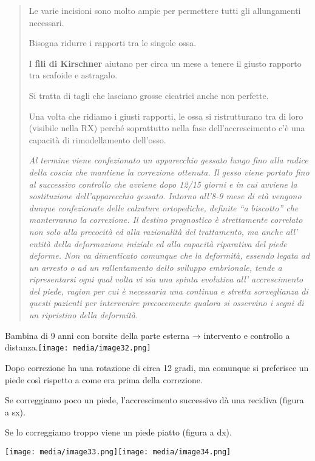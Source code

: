 \documentclass[]{article}
\begin{document}
\begin{quote}
Le varie incisioni sono molto ampie per permettere tutti gli
allungamenti necessari.

Bisogna ridurre i rapporti tra le singole ossa.

I \textbf{fili di Kirschner} aiutano per circa un mese a tenere il
giusto rapporto tra scafoide e astragalo.

Si tratta di tagli che lasciano grosse cicatrici anche non perfette.

Una volta che ridiamo i giusti rapporti, le ossa si ristrutturano tra di
loro (visibile nella RX) perché soprattutto nella fase
dell'accrescimento c'è una capacità di rimodellamento dell'osso.

\emph{Al termine viene confezionato un apparecchio gessato lungo fino
alla radice della coscia che mantiene la correzione ottenuta. Il gesso
viene portato fino al successivo controllo che avviene dopo 12/15 giorni
e in cui avviene la sostituzione dell'apparecchio gessato. Intorno
all'8-9 mese di età vengono dunque confezionate delle calzature
ortopediche, definite ``a biscotto'' che manterranno la correzione. Il
destino prognostico è strettamente correlato non solo alla precocità ed
alla razionalità del trattamento, ma anche all' entità della
deformazione iniziale ed alla capacità riparativa del piede deforme. Non
va dimenticato comunque che la deformità, essendo legata ad un arresto o
ad un rallentamento dello sviluppo embrionale, tende a ripresentarsi
ogni qual volta vi sia una spinta evolutiva all' accrescimento del
piede, ragion per cui è necessaria una continua e stretta sorveglianza
di questi pazienti per intervenire precocemente qualora si osservino i
segni di un ripristino della deformità.}
\end{quote}

Bambina di 9 anni con borsite della parte esterna → intervento e
controllo a
distanza.\texttt{[image: media/image32.png]}

Dopo correzione ha una rotazione di circa 12 gradi, ma comunque si
preferisce un piede così rispetto a come era prima della correzione.

Se correggiamo poco un piede, l'accrescimento successivo dà una recidiva
(figura a sx).

Se lo correggiamo troppo viene un piede piatto (figura a dx).

\texttt{[image: media/image33.png]}\texttt{[image: media/image34.png]}
\end{document}
